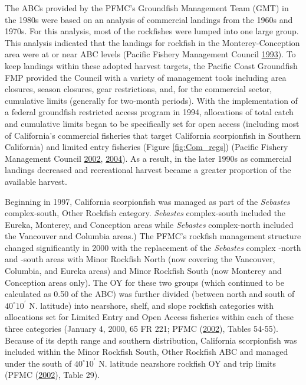 \documentclass[12pt,]{article}
\begin{document}
The ABCs provided by the PFMC's Groundfish Management Team (GMT) in the
1980s were based on an analysis of commercial landings from the 1960s
and 1970s. For this analysis, most of the rockfishes were lumped into
one large group. This analysis indicated that the landings for rockfish
in the Monterey-Conception area were at or near ABC levels (Pacific
Fishery Management Council \protect\hyperlink{ref-PFMC1993}{1993}). To
keep landings within these adopted harvest targets, the Pacific Coast
Groundfish FMP provided the Council with a variety of management tools
including area closures, season closures, gear restrictions, and, for
the commercial sector, cumulative limits (generally for two-month
periods). With the implementation of a federal groundfish restricted
access program in 1994, allocations of total catch and cumulative limits
began to be specifically set for open access (including most of
California's commercial fisheries that target California scorpionfish in
Southern California) and limited entry fisheries (Figure
\ref{fig:Com_regs}) (Pacific Fishery Management Council
\protect\hyperlink{ref-PFMC2002}{2002},
\protect\hyperlink{ref-PFMC2004}{2004}). As a result, in the later 1990s
as commercial landings decreased and recreational harvest became a
greater proportion of the available harvest.

Beginning in 1997, California scorpionfish was managed as part of the
\emph{Sebastes} complex-south, Other Rockfish category. \emph{Sebastes}
complex-south included the Eureka, Monterey, and Conception areas while
\emph{Sebastes} complex-north included the Vancouver and Columbia
areas.) The PFMC's rockfish management structure changed significantly
in 2000 with the replacement of the \emph{Sebastes} complex -north and
-south areas with Minor Rockfish North (now covering the Vancouver,
Columbia, and Eureka areas) and Minor Rockfish South (now Monterey and
Conception areas only). The OY for these two groups (which continued to
be calculated as 0.50 of the ABC) was further divided (between north and
south of \(40^\circ 10^\prime\) N. latitude) into nearshore, shelf, and
slope rockfish categories with allocations set for Limited Entry and
Open Access fisheries within each of these three categories (January 4,
2000, 65 FR 221; PFMC (\protect\hyperlink{ref-PFMC2002}{2002}), Tables
54-55). Because of its depth range and southern distribution, California
scorpionfish was included within the Minor Rockfish South, Other
Rockfish ABC and managed under the south of \(40^\circ 10^\prime\) N.
latitude nearshore rockfish OY and trip limits (PFMC
(\protect\hyperlink{ref-PFMC2002}{2002}), Table 29).
\end{document}
